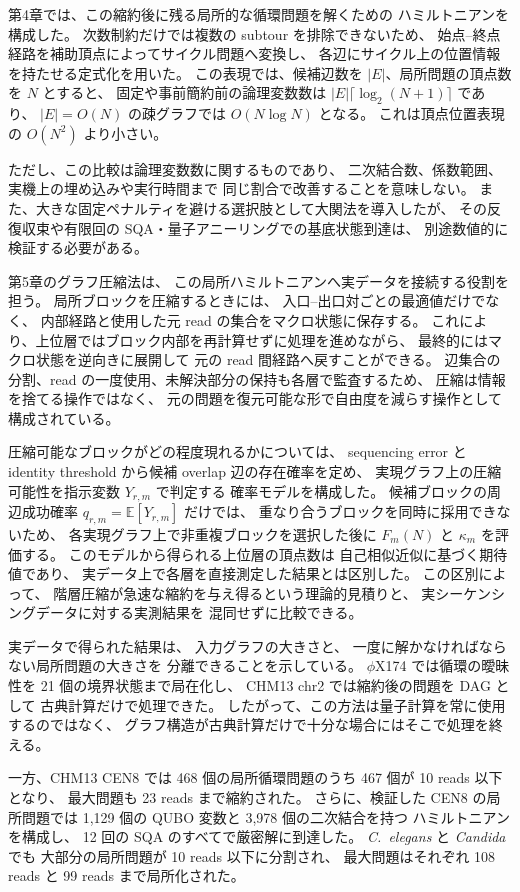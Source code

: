 \documentclass[a4j,10pt]{ujarticle}
\begin{document}
第4章では、この縮約後に残る局所的な循環問題を解くための
ハミルトニアンを構成した。
次数制約だけでは複数の subtour を排除できないため、
始点--終点経路を補助頂点によってサイクル問題へ変換し、
各辺にサイクル上の位置情報を持たせる定式化を用いた。
この表現では、候補辺数を $|E|$、局所問題の頂点数を $N$ とすると、
固定や事前簡約前の論理変数数は
$|E|\lceil\log_2(N+1)\rceil$ であり、
$|E|=O(N)$ の疎グラフでは $O(N\log N)$ となる。
これは頂点位置表現の $O(N^2)$ より小さい。

ただし、この比較は論理変数数に関するものであり、
二次結合数、係数範囲、実機上の埋め込みや実行時間まで
同じ割合で改善することを意味しない。
また、大きな固定ペナルティを避ける選択肢として大関法を導入したが、
その反復収束や有限回の SQA・量子アニーリングでの基底状態到達は、
別途数値的に検証する必要がある。

第5章のグラフ圧縮法は、
この局所ハミルトニアンへ実データを接続する役割を担う。
局所ブロックを圧縮するときには、
入口--出口対ごとの最適値だけでなく、
内部経路と使用した元 read の集合をマクロ状態に保存する。
これにより、上位層ではブロック内部を再計算せずに処理を進めながら、
最終的にはマクロ状態を逆向きに展開して
元の read 間経路へ戻すことができる。
辺集合の分割、read の一度使用、未解決部分の保持も各層で監査するため、
圧縮は情報を捨てる操作ではなく、
元の問題を復元可能な形で自由度を減らす操作として構成されている。

圧縮可能なブロックがどの程度現れるかについては、
sequencing error と identity threshold から候補 overlap 辺の存在確率を定め、
実現グラフ上の圧縮可能性を指示変数 $Y_{r,m}$ で判定する
確率モデルを構成した。
候補ブロックの周辺成功確率
$q_{r,m}=\mathbb{E}[Y_{r,m}]$ だけでは、
重なり合うブロックを同時に採用できないため、
各実現グラフ上で非重複ブロックを選択した後に
$F_m(N)$ と $\kappa_m$ を評価する。
このモデルから得られる上位層の頂点数は
自己相似近似に基づく期待値であり、
実データ上で各層を直接測定した結果とは区別した。
この区別によって、
階層圧縮が急速な縮約を与え得るという理論的見積りと、
実シーケンシングデータに対する実測結果を
混同せずに比較できる。

実データで得られた結果は、
入力グラフの大きさと、
一度に解かなければならない局所問題の大きさを
分離できることを示している。
$\phi$X174 では循環の曖昧性を 21 個の境界状態まで局在化し、
CHM13 chr2 では縮約後の問題を DAG として
古典計算だけで処理できた。
したがって、この方法は量子計算を常に使用するのではなく、
グラフ構造が古典計算だけで十分な場合にはそこで処理を終える。

一方、CHM13 CEN8 では
468 個の局所循環問題のうち 467 個が 10 reads 以下となり、
最大問題も 23 reads まで縮約された。
さらに、検証した CEN8 の局所問題では
1,129 個の QUBO 変数と 3,978 個の二次結合を持つ
ハミルトニアンを構成し、
12 回の SQA のすべてで厳密解に到達した。
\textit{C.~elegans} と \textit{Candida} でも
大部分の局所問題が 10 reads 以下に分割され、
最大問題はそれぞれ 108 reads と 99 reads まで局所化された。
\end{document}
